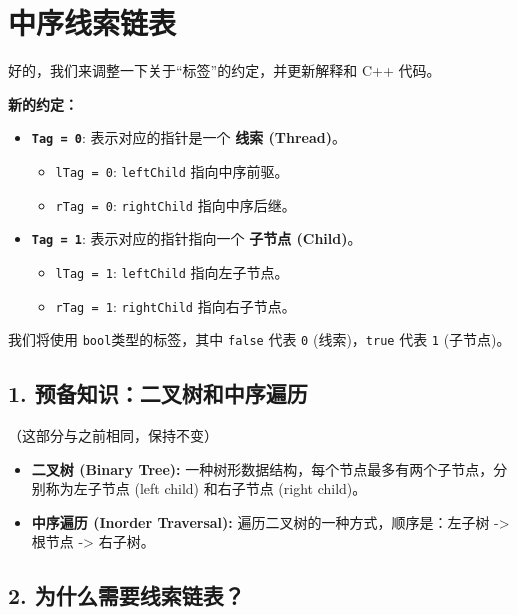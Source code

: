 \section{中序线索链表}

好的，我们来调整一下关于“标签”的约定，并更新解释和 C++ 代码。

\textbf{新的约定：}

\begin{itemize}
	\item \textbf{\lstinline{Tag = 0}}: 表示对应的指针是一个 \textbf{线索 (Thread)}。
	\begin{itemize}
		\item \lstinline{lTag = 0}: \lstinline{leftChild} 指向中序前驱。
		\item \lstinline{rTag = 0}: \lstinline{rightChild} 指向中序后继。
	\end{itemize}
	\item \textbf{\lstinline{Tag = 1}}: 表示对应的指针指向一个 \textbf{子节点 (Child)}。
	\begin{itemize}
		\item \lstinline{lTag = 1}: \lstinline{leftChild} 指向左子节点。
		\item \lstinline{rTag = 1}: \lstinline{rightChild} 指向右子节点。
	\end{itemize}
\end{itemize}

我们将使用 \lstinline{bool}类型的标签，其中 \lstinline{false} 代表 \lstinline{0} (线索)，\lstinline{true} 代表 \lstinline{1} (子节点)。

\subsection{1. 预备知识：二叉树和中序遍历}

（这部分与之前相同，保持不变）

\begin{itemize}
	\item \textbf{二叉树 (Binary Tree):} 一种树形数据结构，每个节点最多有两个子节点，分别称为左子节点 (left child) 和右子节点 (right child)。
	\item \textbf{中序遍历 (Inorder Traversal):} 遍历二叉树的一种方式，顺序是：左子树 -> 根节点 -> 右子树。
\end{itemize}

\subsection{2. 为什么需要线索链表？}

